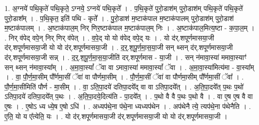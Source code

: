 \documentclass[17pt]{extarticle}
\begin{document}
1. अ॒ग्नये॑ पथि॒कृते॑ पथि॒कृते॒ ऽग्नये॒ ऽग्नये॑ पथि॒कृते᳚ । . प॒थि॒कृते॑ पुरो॒डाश॑म् पुरो॒डाश॑म् पथि॒कृते॑ पथि॒कृते॑ पुरो॒डाश᳚म् । . प॒थि॒कृत॒ इति॑ पथि - कृते᳚ । . पु॒रो॒डाश॑ म॒ष्टाक॑पाल म॒ष्टाक॑पालम् पुरो॒डाश॑म् पुरो॒डाश॑ म॒ष्टाक॑पालम् । . अ॒ष्टाक॑पाल॒म् निर् णिर॒ष्टाक॑पाल म॒ष्टाक॑पाल॒म् निः । . अ॒ष्टाक॑पाल॒मित्य॒ष्टा - क॒पा॒ल॒म् । . निर् व॑पेद् वपे॒न् निर् णिर् व॑पेत् । . व॒पे॒द् यो यो व॑पेद् वपे॒द् यः । . यो द॑र्.शपूर्णमासया॒जी द॑र्.शपूर्णमासया॒जी यो यो द॑र्.शपूर्णमासया॒जी । . द॒र्॒.श॒पू॒र्ण॒मा॒स॒या॒जी सन् थ्सन् द॑र्.शपूर्णमासया॒जी द॑र्.शपूर्णमासया॒जी सन्न् । . द॒र्॒.श॒पू॒र्ण॒मा॒स॒या॒जीति॑ दर्.शपूर्णमास - या॒जी । . सन् न॑मावा॒स्या॑ ममावा॒स्याꣳ॑ सन् थ्सन् न॑मावा॒स्या᳚म् । . अ॒मा॒वा॒स्यां᳚ ॅवा वा ऽमावा॒स्या॑ ममावा॒स्यां᳚ ॅवा । . अ॒मा॒वा॒स्या॑मित्य॑मा - वा॒स्या᳚म् । . वा॒ पौ॒र्ण॒मा॒सीम् पौ᳚र्णमा॒सीं ॅवा॑ वा पौर्णमा॒सीम् । . पौ॒र्ण॒मा॒सीं ॅवा॑ वा पौर्णमा॒सीम् पौ᳚र्णमा॒सीं ॅवा᳚ । . पौ॒र्ण॒मा॒सीमिति॑ पौर्ण - मा॒सीम् । . वा॒ ऽति॒पा॒दये॑ दतिपा॒दये᳚द् वा वा ऽतिपा॒दये᳚त् । . अ॒ति॒पा॒दये᳚त् प॒थः प॒थो॑ ऽतिपा॒दये॑ दतिपा॒दये᳚त् प॒थः । . अ॒ति॒पा॒दये॒दित्य॑ति - पा॒दये᳚त् । . प॒थो वै वै प॒थः प॒थो वै । . वा ए॒ष ए॒ष वै वा ए॒षः । . ए॒षोऽ ध्य ध्ये॒ष ए॒षो ऽधि॑ । . अध्यप॑थे॒ना प॑थे॒ना ध्यध्यप॑थेन । . अप॑थेनै त्ये॒ त्यप॑थे॒ना प॑थेनैति । . ए॒ति॒ यो य ए᳚त्येति॒ यः । . यो द॑र्.शपूर्णमासया॒जी द॑र्.शपूर्णमासया॒जी यो यो द॑र्.शपूर्णमासया॒जी । \newline
\end{document}
